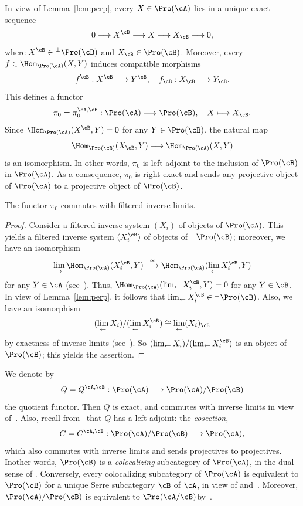 In view of Lemma~\ref{lem:perp}, every $X \in \Pro(\cA)$ lies in a unique exact sequence
\begin{equation}\label{eqn:exact}
0 \longrightarrow X^{\cB} \longrightarrow X \longrightarrow X_{\cB} \longrightarrow 0,
\end{equation}
where $X^{\cB} \in {^{\perp}\Pro(\cB)}$ and $X_{\cB} \in \Pro(\cB)$. Moreover, every $f \in \Hom_{\Pro(\cA)}(X,Y)$ induces compatible morphisms
\[
f^{\cB} : X^{\cB} \longrightarrow Y^{\cB}, \quad f_{\cB} : X_{\cB} \longrightarrow Y_{\cB}.
\]
This defines a functor
\[
\pi_0 = \pi_0^{\cA, \cB} : \Pro(\cA) \longrightarrow \Pro(\cB), \quad X \longmapsto X_{\cB}.
\]
Since $\Hom_{\Pro(\cA)}(X^{\cB}, Y) = 0$ for any $Y \in \Pro(\cB)$, the natural map
\[
\Hom_{\Pro(\cB)}(X_{\cB},Y) \longrightarrow
\Hom_{\Pro(\cA)}(X,Y)
\]
is an isomorphism. In other words, $\pi_0$ is left adjoint to the inclusion of $\Pro(\cB)$ in $\Pro(\cA)$. As a consequence, $\pi_0$ is right exact and sends any projective object of $\Pro(\cA)$ to a projective object of $\Pro(\cB)$.

\begin{lemm}\label{lem:com}
The functor $\pi_0$ commutes with filtered inverse limits.
\end{lemm}

\begin{proof}
Consider a filtered inverse system $(X_i)$ of objects of $\Pro(\cA)$. This yields a filtered inverse system $(X_i^{\cB})$ of objects of ${^{\perp}\Pro(\cB)}$; moreover, we have an isomorphism
\[
\lim_{\to} \Hom_{\Pro(\cA)}(X_i^{\cB},Y)
\stackrel{\cong}{\longrightarrow}
\Hom_{\Pro(\cA)}(\lim_{\leftarrow} X_i^{\cB},Y)
\]
for any $Y \in \cA$ (see~\cite[V.2.3.3]{DG}). Thus, $\Hom_{\Pro(\cA)}(\lim_{\leftarrow} X_i^{\cB},Y) = 0$ for any $Y \in \cB$. In view of Lemma~\ref{lem:perp}, it follows that $\lim_{\leftarrow} X_i^{\cB} \in {^{\perp}\Pro(\cB)}$. Also, we have an isomorphism
\[
(\lim_{\leftarrow} X_i)/ (\lim_{\leftarrow} X_i^{\cB})
\cong \lim_{\leftarrow} (X_i)_{\cB}
\]
by exactness of inverse limits (see~\cite[V.2.2]{DG}). So $(\lim_{\leftarrow} X_i)/ (\lim_{\leftarrow} X_i^{\cB})$ is an object of $\Pro(\cB)$; this yields the assertion.
\end{proof}

We denote by
\[
Q = Q^{\cA,\cB} : \Pro(\cA) \longrightarrow \Pro(\cA)/\Pro(\cB)
\]
the quotient functor. Then $Q$ is exact, and commutes with inverse limits in view of~\cite[III.4.Prop.~9]{Gabriel}. Also, recall from~\cite[III.4.Prop.~8, Cor.~1]{Gabriel} that $Q$ has a left adjoint: the \emph{cosection},
\[
C = C^{\cA,\cB} : \Pro(\cA)/\Pro(\cB) \longrightarrow \Pro(\cA),
\]
which also commutes with inverse limits and sends projectives to projectives. In\linebreak other words, $\Pro(\cB)$ is a \emph{colocalizing} subcategory of $\Pro(\cA)$, in the dual sense of \cite[III.2]{Gabriel}. Conversely, every colocalizing subcategory of $\Pro(\cA)$ is equivalent to $\Pro(\cB)$ for a unique Serre subcategory $\cB$ of $\cA$, in view of \cite[III.4.Prop.~10]{Gabriel} and~\cite[Rem.~2.13]{Br17b}. Moreover, $\Pro(\cA)/\Pro(\cB)$ is equivalent to $\Pro(\cA/\cB)$\linebreak by~\cite[Prop.~2.12]{Br17b}.

